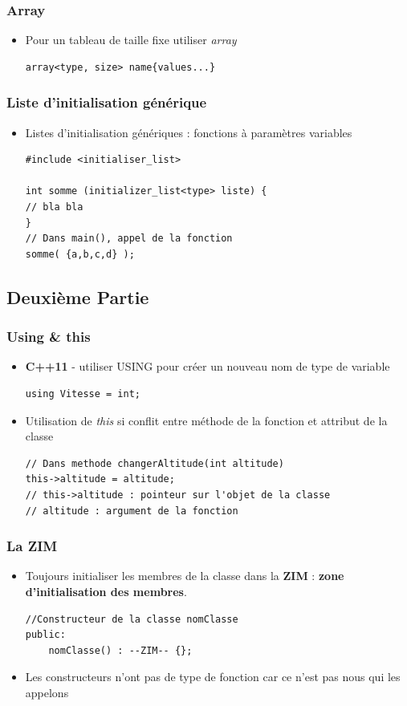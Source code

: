 \documentclass[12pt,a4paper]{article}
\begin{document}
\subsubsection{Array}
\begin{itemize}
\item Pour un tableau de taille fixe utiliser \textit{array}
\begin{lstlisting}
array<type, size> name{values...}
\end{lstlisting}
\end{itemize}
\subsubsection{Liste d'initialisation générique}
\begin{itemize}
\item Listes d'initialisation génériques : fonctions à paramètres variables
\begin{lstlisting}
#include <initialiser_list>

int somme (initializer_list<type> liste) {
// bla bla
}
// Dans main(), appel de la fonction
somme( {a,b,c,d} );
\end{lstlisting}
\end{itemize}

\subsection{Deuxième Partie}
\subsubsection{Using \& this}
\begin{itemize}
\item \textbf{C++11} - utiliser USING pour créer un nouveau nom de type de variable
\begin{lstlisting}
using Vitesse = int;
\end{lstlisting}
\item Utilisation de \textit{this} si conflit entre méthode de la fonction et attribut de la classe
\begin{lstlisting}
// Dans methode changerAltitude(int altitude)
this->altitude = altitude;
// this->altitude : pointeur sur l'objet de la classe
// altitude : argument de la fonction
\end{lstlisting}
\end{itemize}
\subsubsection{La ZIM}
\begin{itemize}
\item Toujours initialiser les membres de la classe dans la \textbf{ZIM} : \textbf{zone d'initialisation des membres}.
\begin{lstlisting}
//Constructeur de la classe nomClasse
public:
	nomClasse() : --ZIM-- {};
\end{lstlisting}
\item Les constructeurs n'ont pas de type de fonction car ce n'est pas nous qui les appelons
\end{itemize}
\end{document}

